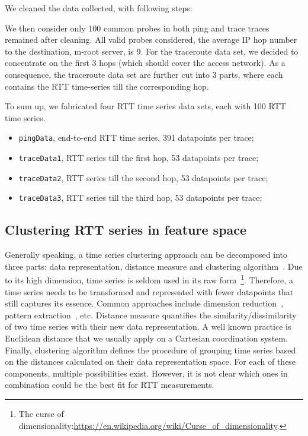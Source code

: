 We cleaned the data collected, with following steps:

We then consider only 100 common probes in both ping and trace traces remained after cleaning.
All valid probes considered, the average IP hop number to the destination, m-root server, is 9. 
For the traceroute data set, we decided to concentrate on the first 3 hops (which should cover the access network). As a consequence, the traceroute data set are further cut into 3 parts, where each contains the RTT time-series till the corresponding hop.

To sum up, we fabricated four RTT time series data sets, each with 100 RTT time series.
\begin{itemize}
\item \texttt{pingData}, end-to-end RTT time series, 391 datapoints per trace;
\item \texttt{traceData1}, RTT series till the first hop, 53 datapoints per trace;
\item \texttt{traceData2}, RTT series till the second hop, 53 datapoints per trace;
\item \texttt{traceData3}, RTT series till the third hop, 53 datapoints per trace;
\end{itemize}

\subsection{Clustering RTT series in feature space}
\label{sec:cls_ft}
Generally speaking, a time series clustering approach can be decomposed into three parts: data representation, distance measure and clustering algorithm~\cite{Aghabozorgi2015}. 
Due to its high dimension, time series is seldom used in its raw form~\footnote{The curse of dimensionality:\url{https://en.wikipedia.org/wiki/Curse_of_dimensionality}.}.
Therefore, a time series needs to be transformed and represented with fewer datapoints that still captures its essence.
Common approaches include dimension reduction~\cite{Elhamifar2013}, pattern extraction~\cite{Ulanova2015}, etc.
Distance measure quantifies the similarity/dissimilarity of two time series with their new data representation.
A well known practice is Euclidean distance that we usually apply on a Cartesian coordination system.
Finally, clustering algorithm defines the procedure of grouping time series based on the distances calculated on their data representation space.
For each of these components, multiple possibilities exist. However, it is not clear which ones in combination could be the best fit for RTT measurements. 


